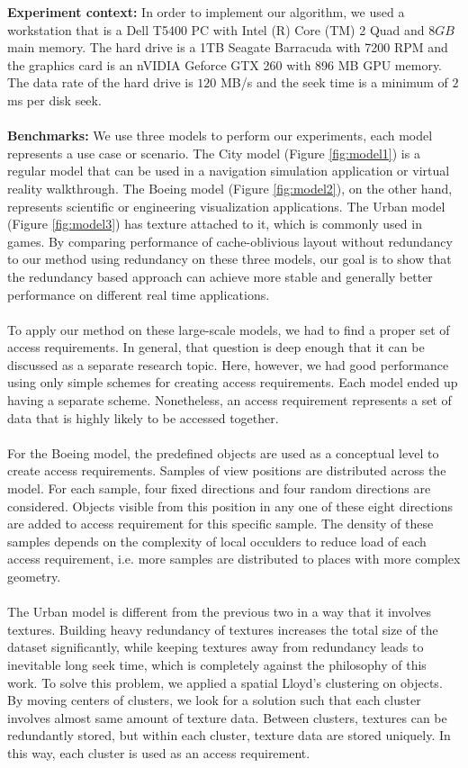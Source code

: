 \textbf{Experiment context:}
In order to implement our algorithm, we used a workstation that is a Dell T5400 PC with Intel (R) Core (TM) 2 Quad and $8GB$ main memory. The hard drive is a 1TB Seagate Barracuda with 7200 RPM and the graphics card is an nVIDIA Geforce GTX 260 with 896 MB GPU memory. The data rate of the hard drive is $120$ MB/s and the seek time is a minimum of $2$ ms per disk seek.\\
\\
\textbf{Benchmarks:}
We use three models to perform our experiments, each model represents a use
case or scenario. The City model (Figure \ref{fig:model1}) is a regular model
that can be used in a navigation simulation application or virtual reality
walkthrough. The Boeing model (Figure \ref{fig:model2}), on the other hand,
represents scientific or engineering visualization applications. The Urban
model (Figure \ref{fig:model3}) has texture attached to it, which is commonly
used in games. By comparing performance of cache-oblivious layout without
redundancy~\cite{cacheobliviouslayout} to our method using redundancy on these three models, our goal
is to show that the redundancy based approach can achieve more stable and generally
better performance on different real time applications. \\
\\ To apply our method on these large-scale models, we had to find a proper set
of access requirements. In general, that question is deep enough that it can be
discussed as a separate research topic. Here, however, we had good performance
using only simple schemes for creating access requirements. Each model ended up
having a separate scheme. Nonetheless, an access requirement represents a set
of data that is highly likely to be accessed together. \\
\\
For the Boeing model, the predefined objects are used as a conceptual level to create access requirements. Samples of view positions are distributed across the model. For each sample, four fixed directions and four random directions are considered. Objects visible from this position in any one of these eight directions are added to access requirement for this specific sample. The density of these samples depends on the complexity of local occulders to reduce load of each access requirement, i.e. more samples are distributed to places with more complex geometry. \\
\\
The Urban model is different from the previous two in a way that it involves textures. Building heavy redundancy of textures increases the total size of the dataset significantly, while keeping textures away from redundancy leads to inevitable long seek time, which is completely against the philosophy of this work. To solve this problem, we applied a spatial Lloyd’s clustering \cite{lloydclustering} on objects. By moving centers of clusters, we look for a solution such that each cluster involves almost same amount of texture data. Between clusters, textures can be redundantly stored, but within each cluster, texture data are stored uniquely. In this way, each cluster is used as an access requirement.  \\
